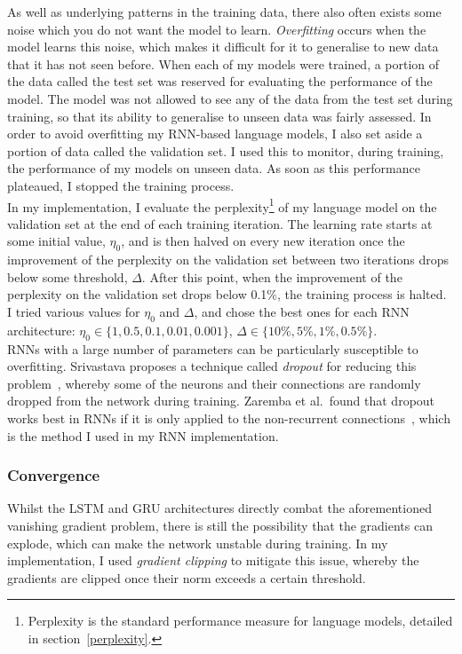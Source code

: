 \documentclass[a4paper, 12pt]{report}
\newcommand{\tit}[1]{\textit{#1}}
\begin{document}
As well as underlying patterns in the training data, there also often exists some noise which you do not want the model to learn. \tit{Overfitting} occurs when the model learns this noise, which makes it difficult for it to generalise to new data that it has not seen before. When each of my models were trained, a portion of the data called the test set was reserved for evaluating the performance of the model. The model was not allowed to see any of the data from the test set during training, so that its ability to generalise to unseen data was fairly assessed. In order to avoid overfitting my RNN-based language models, I also set aside a portion of data called the validation set. I used this to monitor, during training, the performance of my models on unseen data. As soon as this performance plateaued, I stopped the training process. \\

In my implementation, I evaluate the perplexity\footnote{Perplexity is the standard performance measure for language models, detailed in section~\ref{perplexity}.} of my language model on the validation set at the end of each training iteration. The learning rate starts at some initial value, $\eta_0$, and is then halved on every new iteration once the improvement of the perplexity on the validation set between two iterations drops below some threshold, $\Delta$. After this point, when the improvement of the perplexity on the validation set drops below 0.1\%, the training process is halted. I tried various values for $\eta_0$ and $\Delta$, and chose the best ones for each RNN architecture: $\eta_0 \in \{1, 0.5, 0.1, 0.01, 0.001\}$, $\Delta \in \{10\%, 5\%, 1\%, 0.5\%\}$. \\

RNNs with a large number of parameters can be particularly susceptible to overfitting. Srivastava proposes a technique called \tit{dropout} for reducing this problem~\cite{dropout:srivastava2013}, whereby some of the neurons and their connections are randomly dropped from the network during training. Zaremba et al.\ found that dropout works best in RNNs if it is only applied to the non-recurrent connections~\cite{dropout_rnns:zaremba2014}, which is the method I used in my RNN implementation.

\subsubsection{Convergence}
Whilst the LSTM and GRU architectures directly combat the aforementioned vanishing gradient problem, there is still the possibility that the gradients can explode, which can make the network unstable during training. In my implementation, I used \tit{gradient clipping} to mitigate this issue, whereby the gradients are clipped once their norm exceeds a certain threshold. \\
\end{document}
